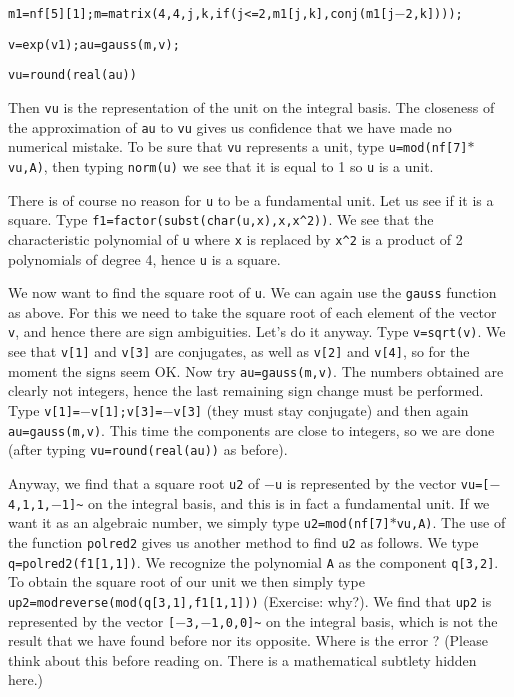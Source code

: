 {\tt m1=nf[5][1];m=matrix(4,4,j,k,if(j<=2,m1[j,k],conj(m1[j$-$2,k])));}

{\tt v=exp(v1);au=gauss(m,v);}

{\tt vu=round(real(au))}

Then {\tt vu} is the representation of the unit on the integral basis.
The closeness of the approximation of {\tt au} to {\tt vu} gives us
confidence that we have made no numerical mistake. To be sure that {\tt vu}
represents a unit, type {\tt u=mod(nf[7]$*$vu,A)}, then typing
{\tt norm(u)} we see that it is equal to 1 so {\tt u} is a unit.

There is of course no reason for {\tt u} to be a fundamental unit.
Let us see if it is a square. Type {\tt f1=factor(subst(char(u,x),x,x\^{}2))}.
We see that the characteristic polynomial of {\tt u} where {\tt x}
is replaced by {\tt x\^{}2} is a product of 2 polynomials of degree 4, hence
{\tt u} is a square.

We now want to find the square root of {\tt u}. We can again use the 
{\tt gauss} function as above. For this we need to take the square
root of each element of the vector {\tt v}, and hence there are
sign ambiguities. Let's do it anyway. Type {\tt v=sqrt(v)}. We see that
{\tt v[1]} and {\tt v[3]} are conjugates, as well as {\tt v[2]} and {\tt v[4]},
so for the moment the signs seem OK. Now try {\tt au=gauss(m,v)}. The numbers
obtained are clearly not integers, hence the last remaining sign change must
be performed. Type {\tt v[1]=$-$v[1];v[3]=$-$v[3]} (they must stay conjugate)
and then again {\tt au=gauss(m,v)}. This time the components are close to 
integers, so we are done (after typing {\tt vu=round(real(au))} as before).

Anyway, we find that a square root {\tt u2} of {\tt $-$u} is represented by the 
vector {\tt vu=[$-$4,1,1,$-$1]\~{}} on the integral basis, and this is in fact a
fundamental unit. If we want it as an algebraic number, we simply type
{\tt u2=mod(nf[7]$*$vu,A)}.
\medskip
The use of the function {\tt polred2} gives us another method to find
{\tt u2} as follows. We type {\tt q=polred2(f1[1,1])}. We
recognize the polynomial {\tt A} as the component {\tt q[3,2]}. To 
obtain the square root of our unit we then simply type
{\tt up2=modreverse(mod(q[3,1],f1[1,1]))} (Exercise: why?). We find that
{\tt up2} is represented by the vector {\tt [$-$3,$-$1,0,0]\~{}}
on the integral basis, which is not the result that we have found before
nor its opposite. Where is the error ? (Please think about this before
reading on. There is a mathematical subtlety hidden here.)

